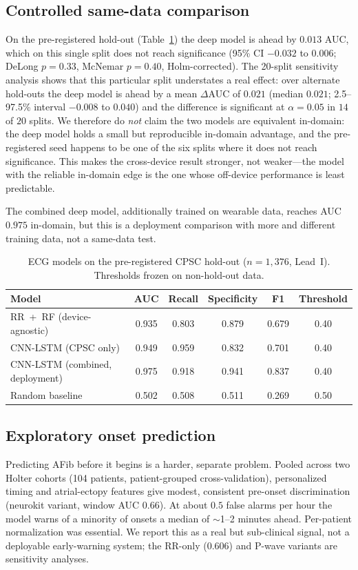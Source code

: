 \documentclass[]{ws-procs9x6}
\begin{document}
\subsection{Controlled same-data comparison}
On the pre-registered hold-out (Table~\ref{tab:ecg}) the deep model is ahead by
$0.013$ AUC, which on this single split does not reach significance (95\% CI
$-0.032$ to $0.006$; DeLong $p{=}0.33$, McNemar $p{=}0.40$, Holm-corrected). The
20-split sensitivity analysis shows that this particular split understates a real
effect: over alternate hold-outs the deep model is ahead by a mean $\Delta$AUC of
$0.021$ (median $0.021$; 2.5--97.5\% interval $-0.008$ to $0.040$) and the
difference is significant at $\alpha{=}0.05$ in $14$ of $20$ splits. We therefore
do \emph{not} claim the two models are equivalent in-domain: the deep model holds
a small but reproducible in-domain advantage, and the pre-registered seed happens
to be one of the six splits where it does not reach significance. This makes the
cross-device result stronger, not weaker---the model with the reliable in-domain
edge is the one whose off-device performance is least predictable.

The combined deep model, additionally trained on wearable data, reaches AUC
$0.975$ in-domain, but this is a deployment comparison with more and different
training data, not a same-data test.

\begin{table}[t]
\centering
\caption{ECG models on the pre-registered CPSC hold-out ($n{=}1{,}376$, Lead~I).
Thresholds frozen on non-hold-out data.}
\label{tab:ecg}
\begin{tabular}{lccccc}
\toprule
Model & AUC & Recall & Specificity & F1 & Threshold \\
\midrule
RR~+~RF (device-agnostic) & 0.935 & 0.803 & 0.879 & 0.679 & 0.40 \\
CNN-LSTM (CPSC only) & 0.949 & 0.959 & 0.832 & 0.701 & 0.40 \\
CNN-LSTM (combined, deployment) & 0.975 & 0.918 & 0.941 & 0.837 & 0.40 \\
Random baseline & 0.502 & 0.508 & 0.511 & 0.269 & 0.50 \\
\bottomrule
\end{tabular}
\end{table}

\subsection{Exploratory onset prediction}
Predicting AFib before it begins is a harder, separate problem. Pooled across two
Holter cohorts (104 patients, patient-grouped cross-validation), personalized
timing and atrial-ectopy features give modest, consistent pre-onset discrimination
(neurokit variant, window AUC $0.66$). At about $0.5$ false alarms per hour the
model warns of a minority of onsets a median of $\sim$1--2 minutes ahead.
Per-patient normalization was essential. We report this as a real but sub-clinical
signal, not a deployable early-warning system; the RR-only ($0.606$) and P-wave
variants are sensitivity analyses.
\end{document}
